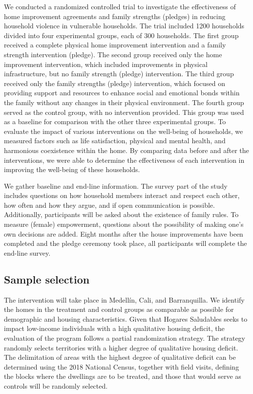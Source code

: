         We conducted a randomized controlled trial to investigate the effectiveness of home improvement agreements and family strengths (pledges) in reducing household violence in vulnerable households. The trial included 1200 households divided into four experimental groups, each of 300 households. The first group received a complete physical home improvement intervention and a family strength intervention (pledge). The second group received only the home improvement intervention, which included improvements in physical infrastructure, but no family strength (pledge) intervention. The third group received only the family strengths (pledge) intervention, which focused on providing support and resources to enhance social and emotional bonds within the family without any changes in their physical environment. The fourth group served as the control group, with no intervention provided. This group was used as a baseline for comparison with the other three experimental groups. To evaluate the impact of various interventions on the well-being of households, we measured factors such as life satisfaction, physical and mental health, and harmonious coexistence within the home. By comparing data before and after the interventions, we were able to determine the effectiveness of each intervention in improving the well-being of these households. 

        We gather baseline and end-line information. The survey part of the study includes questions on how household members interact and respect each other, how often and how they argue, and if open communication is possible. Additionally, participants will be asked about the existence of family rules. To measure (female) empowerment, questions about the possibility of making one's own decisions are added.  Eight months after the house improvements have been completed and the pledge ceremony took place, all participants will complete the end-line survey.  \\

        
    \subsection{Sample selection}

        The intervention will take place in Medellín, Cali, and Barranquilla. We identify the homes in the treatment and control groups as comparable as possible for demographic and housing characteristics. Given that Hogares Saludables seeks to impact low-income individuals with a high qualitative housing deficit, the evaluation of the program follows a partial randomization strategy. The strategy randomly selects territories with a higher degree of qualitative housing deficit. The delimitation of areas with the highest degree of qualitative deficit can be determined using the 2018 National Census, together with field visits, defining the blocks where the dwellings are to be treated, and those that would serve as controls will be randomly selected.

